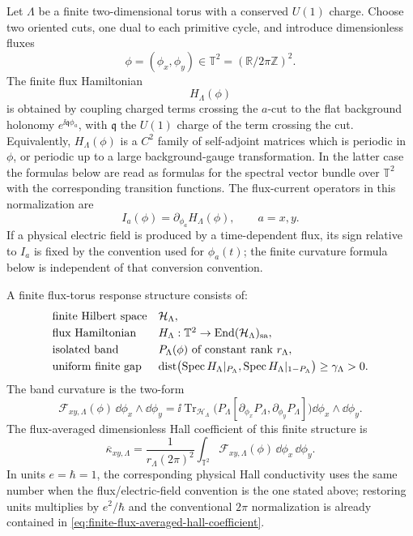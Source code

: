 Let \(\Lambda\) be a finite two-dimensional torus with a conserved
\(U(1)\) charge.  Choose two oriented cuts, one dual to each primitive cycle,
and introduce dimensionless fluxes
\[
  \phi=(\phi_x,\phi_y)\in\mathbb T^2=(\mathbb R/2\pi\mathbb Z)^2 .
\]
The finite flux Hamiltonian
\[
  H_\Lambda(\phi)
\]
is obtained by coupling charged terms crossing the \(a\)-cut to the flat
background holonomy \(e^{\ii \mathfrak q\phi_a}\), with \(\mathfrak q\) the
\(U(1)\) charge of the term crossing the cut.  Equivalently,
\(H_\Lambda(\phi)\) is a \(C^2\) family of self-adjoint matrices which is
periodic in \(\phi\), or periodic up to a large background-gauge
transformation.  In the latter case the formulas below are read as formulas
for the spectral vector bundle over \(\mathbb T^2\) with the corresponding
transition functions.  The flux-current operators in this normalization are
\[
  I_a(\phi)=\partial_{\phi_a}H_\Lambda(\phi),
  \qquad a=x,y .
\]
If a physical electric field is produced by a time-dependent flux, its sign
relative to \(I_a\) is fixed by the convention used for
\(\phi_a(t)\); the finite curvature formula below is independent of that
conversion convention.

\begin{definition}
\label{def:finite-flux-torus-response-datum}
A finite flux-torus response structure consists of:
\[
\begin{array}{ll}
  \text{finite Hilbert space} & \mathcal H_\Lambda,\\[1mm]
  \text{flux Hamiltonian} & H_\Lambda:\mathbb T^2\to
  \operatorname{End}(\mathcal H_\Lambda)_{\rm sa},\\[1mm]
  \text{isolated band} & P_\Lambda(\phi)\text{ of constant rank }r_\Lambda,\\[1mm]
  \text{uniform finite gap} &
  \operatorname{dist}\bigl(\operatorname{Spec}H_\Lambda|_{P_\Lambda},
  \operatorname{Spec}H_\Lambda|_{1-P_\Lambda}\bigr)\ge\gamma_\Lambda>0 .
\end{array}
\]
The band curvature is the two-form
\begin{equation}
  \mathcal F_{xy,\Lambda}(\phi)\,
  \dd\phi_x\wedge\dd\phi_y
  =
  \ii\operatorname{Tr}_{\mathcal H_\Lambda}
  \bigl(P_\Lambda[\partial_{\phi_x}P_\Lambda,
  \partial_{\phi_y}P_\Lambda]\bigr)
  \dd\phi_x\wedge\dd\phi_y .
  \label{eq:finite-flux-curvature}
\end{equation}
The flux-averaged dimensionless Hall coefficient of this finite structure is
\begin{equation}
  \overline\kappa_{xy,\Lambda}
  =
  \frac{1}{r_\Lambda(2\pi)^2}
  \int_{\mathbb T^2}\mathcal F_{xy,\Lambda}(\phi)\,
  \dd\phi_x\,\dd\phi_y .
  \label{eq:finite-flux-averaged-hall-coefficient}
\end{equation}
In units \(e=\hbar=1\), the corresponding physical Hall conductivity uses
the same number when the flux/electric-field convention is the one stated
above; restoring units multiplies by \(e^2/\hbar\) and the conventional
\(2\pi\) normalization is already contained in
\eqref{eq:finite-flux-averaged-hall-coefficient}.
\end{definition}

